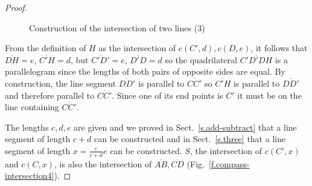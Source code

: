 \begin{proof}
\begin{figure}[b]
\begin{center}
\end{center}
\caption{Construction of  the intersection of two lines (3)}\label{f.compass-intersection3}
\end{figure}

From the definition of $H$ as the intersection of $c(C',d), c(D,e)$, it follows that $\overline{DH}=e$, $\overline{C'H}=d$, but $\overline{C'D'} = e$, $\overline{D'D}=d$ so the quadrilateral $\overline{C'D'DH}$ is a parallelogram since the lengths of both pairs of opposite sides are equal. By construction, the line segment $\overline{DD'}$ is parallel to $\overline{CC'}$ so $\overline{C'H}$ is parallel to $\overline{DD'}$ and therefore parallel to $\overline{CC'}$. Since one of its end points is $C'$ it must be on the line containing $\overline{CC'}$.

The lengths $c,d,e$ are given and we proved in Sect.~\ref{s.add-subtract} that a line segment of length $c+d$ can be constructed and in Sect.~\ref{s.three} that a line segment of length $x=\displaystyle\frac{c}{c+d}e$ can be constructed. $S$, the intersection of $c(C',x)$ and $c(C,x)$, is also the intersection of $\overline{AB}, \overline{CD}$ (Fig.~\ref{f.compass-intersection4}).
\end{proof}

